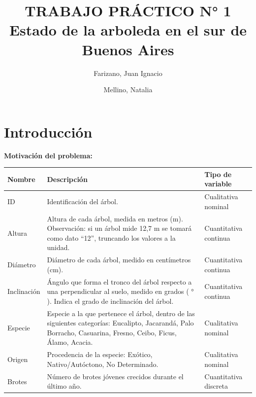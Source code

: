 \documentclass{article}
\begin{document}
\title{
  TRABAJO PRÁCTICO N° 1\\
  \large Estado de la arboleda en el sur de Buenos Aires
}

\author{
  Farizano, Juan Ignacio\\
  \and
  Mellino, Natalia
}
\date{}

\maketitle
\newpage

\tableofcontents
\newpage

\section{Introducción}
\textbf{Motivación del problema:}

\begin{center}
\begin{tabular}{| l | p{6cm} | l |}
\hline
Nombre & Descripción & Tipo de variable \\ \hline
ID & Identificación del árbol. & Cualitativa nominal \\ \hline
Altura & Altura de cada árbol, medida en metros (m). Observación: si un árbol
mide 12,7 m se tomará como dato “12”, truncando los valores a la unidad. & 
Cuantitativa continua \\ \hline
Diámetro & Diámetro de cada árbol, medido en centímetros (cm). & 
Cuantitativa continua \\ \hline
Inclinación & Ángulo que forma el tronco del árbol respecto a una perpendicular al suelo,
medido en grados ( ° ). Indica el grado de inclinación del árbol. &
Cuantitativa continua \\ \hline
Especie & Especie a la que pertenece el árbol, dentro de las siguientes
categorías: Eucalipto, Jacarandá, Palo Borracho, Casuarina, Fresno, Ceibo,
Ficus, Álamo, Acacia. & Cualitativa nominal \\ \hline
Origen & Procedencia de la especie: Exótico, Nativo/Autóctono, No Determinado.
& Cualitativa nominal \\ \hline
Brotes & Número de brotes jóvenes crecidos durante el último año. &
Cuantitativa discreta \\ \hline
\end{tabular}
\end{center}
\end{document}
